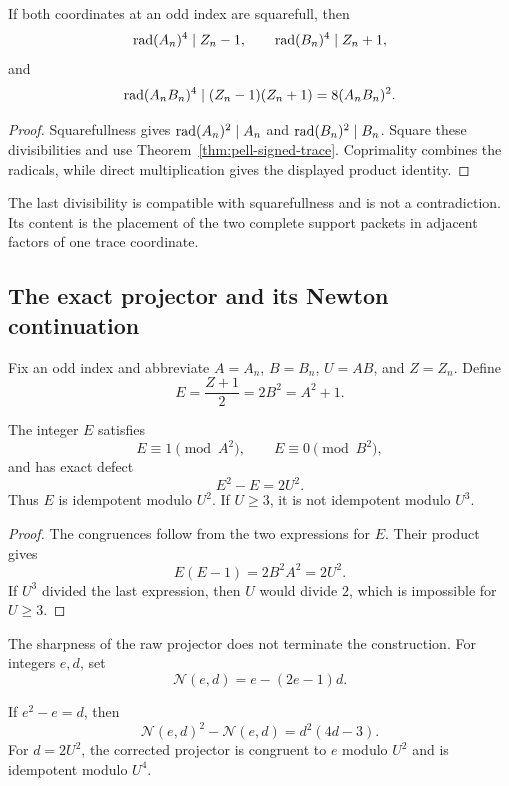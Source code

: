 \begin{corollary}\label{cor:pell-signed-radical}
If both coordinates at an odd index are squarefull, then
\[
 \operatorname{rad}(A_n)^4\mid Z_n-1,\qquad
 \operatorname{rad}(B_n)^4\mid Z_n+1,
\]
and
\[
 \operatorname{rad}(A_nB_n)^4
 \mid (Z_n-1)(Z_n+1)=8(A_nB_n)^2.
\]
\end{corollary}

\begin{proof}
Squarefullness gives $\operatorname{rad}(A_n)^2\mid A_n$ and
$\operatorname{rad}(B_n)^2\mid B_n$.  Square these divisibilities and use
Theorem~\ref{thm:pell-signed-trace}.  Coprimality combines the radicals, while direct
multiplication gives the displayed product identity.
\end{proof}

The last divisibility is compatible with squarefullness and is not a
contradiction.  Its content is the placement of the two complete support
packets in adjacent factors of one trace coordinate.

\subsection{The exact projector and its Newton continuation}

Fix an odd index and abbreviate $A=A_n$, $B=B_n$, $U=AB$, and $Z=Z_n$.
Define
\[
 E=\frac{Z+1}{2}=2B^2=A^2+1.
\]

\begin{theorem}\label{thm:pell-signed-projector}
The integer $E$ satisfies
\[
 E\equiv1\pmod{A^2},\qquad E\equiv0\pmod{B^2},
\]
and has exact defect
\begin{equation}\label{eq:pell-signed-defect}
 E^2-E=2U^2.
\end{equation}
Thus $E$ is idempotent modulo $U^2$.  If $U\geq3$, it is not idempotent
modulo $U^3$.
\end{theorem}

\begin{proof}
The congruences follow from the two expressions for $E$.  Their product
gives
\[
 E(E-1)=2B^2A^2=2U^2.
\]
If $U^3$ divided the last expression, then $U$ would divide $2$, which is
impossible for $U\geq3$.
\end{proof}

The sharpness of the raw projector does not terminate the construction.
For integers $e,d$, set
\[
 \mathcal N(e,d)=e-(2e-1)d.
\]

\begin{theorem}\label{thm:pell-signed-newton}
If $e^2-e=d$, then
\[
 \mathcal N(e,d)^2-\mathcal N(e,d)=d^2(4d-3).
\]
For $d=2U^2$, the corrected projector is congruent to $e$ modulo $U^2$
and is idempotent modulo $U^4$.
\end{theorem}


